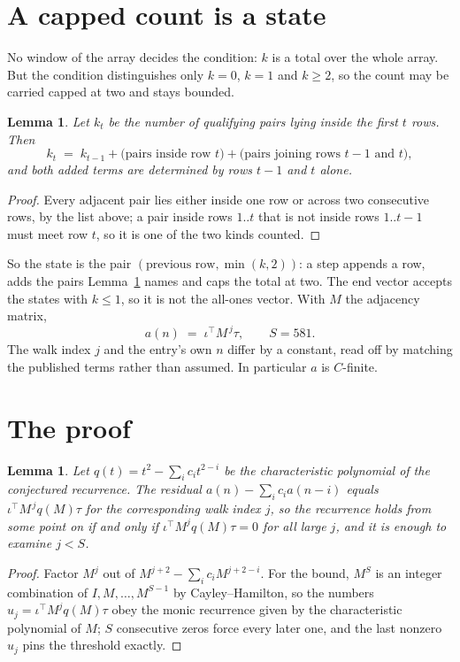 \documentclass[11pt,a4paper]{article}
\theoremstyle{plain}
\newtheorem{lemma}[theorem]{Lemma}
\theoremstyle{definition}
\begin{document}
\section{A capped count is a state}

No window of the array decides the condition: $k$ is a total over the whole array. But the
condition distinguishes only $k=0$, $k=1$ and $k\ge2$, so the count may be carried capped at
two and stays bounded.

\begin{lemma}\label{lem:cap}
Let $k_t$ be the number of qualifying pairs lying inside the first $t$ rows. Then
\[
k_{t}\;=\;k_{t-1}+\bigl(\text{pairs inside row } t\bigr)
+\bigl(\text{pairs joining rows } t-1 \text{ and } t\bigr),
\]
and both added terms are determined by rows $t-1$ and $t$ alone.
\end{lemma}

\begin{proof}
Every adjacent pair lies either inside one row or across two consecutive rows, by the list
above; a pair inside rows $1..t$ that is not inside rows $1..t-1$ must meet row $t$, so it is
one of the two kinds counted.
\end{proof}

So the state is the pair $(\text{previous row},\min(k,2))$: a step appends a row, adds the
pairs Lemma~\ref{lem:cap} names and caps the total at two. The end vector accepts the states
with $k\le1$, so it is not the all-ones vector. With $M$ the adjacency matrix,
\[
a(n)\;=\;\iota^{\!\top}M^{\,j}\tau ,\qquad S=581.
\]
The walk index $j$ and the entry's own $n$ differ by a constant, read off by matching the
published terms rather than assumed. In particular $a$ is $C$-finite.

\section{The proof}

\begin{lemma}\label{lem:crit}
Let $q(t)=t^{2}-\sum_i c_it^{2-i}$ be the characteristic polynomial of the
conjectured recurrence. The residual $a(n)-\sum_ic_ia(n-i)$ equals
$\iota^{\!\top}M^{\,j}q(M)\tau$ for the corresponding walk index $j$, so the recurrence
holds from some point on if and only if $\iota^{\!\top}M^{j}q(M)\tau=0$ for all large $j$,
and it is enough to examine $j<S$.
\end{lemma}

\begin{proof}
Factor $M^{j}$ out of $M^{j+2}-\sum_ic_iM^{j+2-i}$. For the bound, $M^{S}$
is an integer combination of $I,M,\dots,M^{S-1}$ by Cayley--Hamilton, so the numbers
$u_j=\iota^{\!\top}M^{j}q(M)\tau$ obey the monic recurrence given by the characteristic
polynomial of $M$; $S$ consecutive zeros force every later one, and the last nonzero $u_j$
pins the threshold exactly.
\end{proof}
\end{document}
